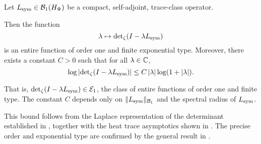 \begin{lemma}
\label{lem:det_growth_bound}
Let \( L_{\mathrm{sym}} \in \mathcal{B}_1(H_{\Psi}) \) be a compact, self-adjoint, trace-class operator.

Then the function
\[
\lambda \mapsto \det\nolimits_{\zeta}(I - \lambda L_{\mathrm{sym}})
\]
is an entire function of order one and finite exponential type. Moreover, there exists a constant \( C > 0 \) such that for all \( \lambda \in \mathbb{C} \),
\[
\log \left| \det\nolimits_{\zeta}(I - \lambda L_{\mathrm{sym}}) \right|
\le C\, |\lambda| \log(1 + |\lambda|).
\]

\medskip
\noindent
That is, \( \det\nolimits_\zeta(I - \lambda L_{\mathrm{sym}}) \in \mathcal{E}_1 \), the class of entire functions of order one and finite type. The constant \( C \) depends only on \( \|L_{\mathrm{sym}}\|_{\mathcal{B}_1} \) and the spectral radius of \( L_{\mathrm{sym}} \).

\medskip
\noindent
This bound follows from the Laplace representation of the determinant established in , together with the heat trace asymptotics shown in . The precise order and exponential type are confirmed by the general result in .
\end{lemma}
